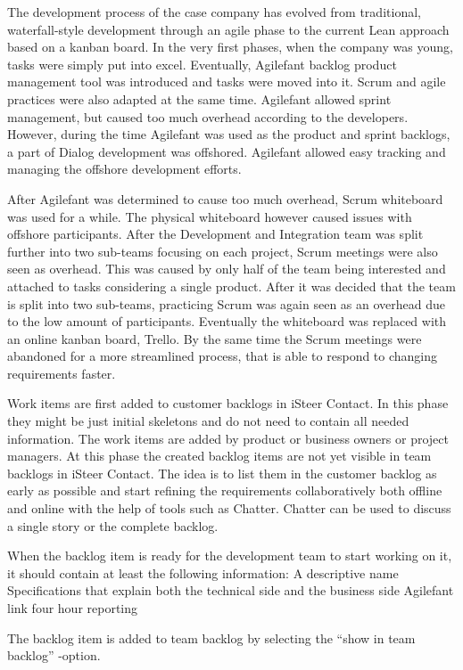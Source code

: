 \documentclass[english]{tktltiki2}
\theoremstyle{definition}
\theoremstyle{remark}
\begin{document}
The development process of the case company has evolved from traditional, waterfall-style development through an agile phase to the current Lean approach based on a kanban board. In the very first phases, when the company was young, tasks were simply put into excel. Eventually, Agilefant backlog product management tool was introduced and tasks were moved into it. Scrum and agile practices were also adapted at the same time. Agilefant allowed sprint management, but caused too much overhead according to the developers. However, during the time Agilefant was used as the product and sprint backlogs, a part of Dialog development was offshored. Agilefant allowed easy tracking and managing the offshore development efforts.

After Agilefant was determined to cause too much overhead, Scrum whiteboard was used for a while. The physical whiteboard however caused issues with offshore participants. After the Development and Integration team was split further into two sub-teams focusing on each project, Scrum meetings were also seen as overhead. This was caused by only half of the team being interested and attached to tasks considering a single product. After it was decided that the team is split into two sub-teams, practicing Scrum was again seen as an overhead due to the low amount of participants. Eventually the whiteboard was replaced with an online kanban board, Trello. By the same time the Scrum meetings were abandoned for a more streamlined process, that is able to respond to changing requirements faster. 

Work items are first added to customer backlogs in iSteer Contact. In this phase they might be just initial skeletons and do not need to contain all needed information. The work items are added by product or business owners or project managers. At this phase the created backlog items are not yet visible in team backlogs in iSteer Contact. The idea is to list them in the customer backlog as early as possible and start refining the requirements collaboratively both offline and online with the help of tools such as Chatter. Chatter can be used to discuss a single story or the complete backlog.

When the backlog item is ready for the development team to start working on it, it should contain at least the following information:
A descriptive name
Specifications that explain both the technical side and the business side
Agilefant link four hour reporting

The backlog item is added to team backlog by selecting the “show in team backlog” -option.
\end{document}
